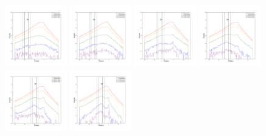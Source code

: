\documentclass[12pt,prd]{article}
\begin{document}
\begin{figure}[h!]
\includegraphics[width=0.24\textwidth]{../figures/scanning_plotsgaiascan_l315_0_b66_4_ra197_7_dec4_0_npy_4.pdf}
\includegraphics[width=0.24\textwidth]{../figures/scanning_plotsgaiascan_l315_0_b66_4_ra197_7_dec4_0_npy_5.pdf}
\includegraphics[width=0.24\textwidth]{../figures/scanning_plotsgaiascan_l315_0_b66_4_ra197_7_dec4_0_npy_6.pdf}
\includegraphics[width=0.24\textwidth]{../figures/scanning_plotsgaiascan_l315_0_b66_4_ra197_7_dec4_0_npy_7.pdf}
\includegraphics[width=0.24\textwidth]{../figures/scanning_plotsgaiascan_l315_0_b66_4_ra197_7_dec4_0_npy_8.pdf}
\includegraphics[width=0.24\textwidth]{../figures/scanning_plotsgaiascan_l315_0_b66_4_ra197_7_dec4_0_npy_9.pdf}

\end{figure}
\end{document}
